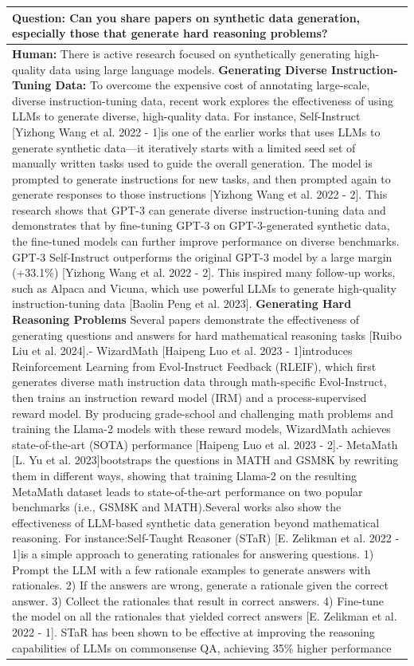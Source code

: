 \begin{table}[t!]
\renewcommand{\arraystretch}{1.2}
\setlength{\tabcolsep}{2pt}
\footnotesize
    \centering
    \begin{tabular}{p{15cm}}%
\toprule
{\bf Question:} Can you share papers on synthetic data generation, especially those that generate hard reasoning problems?
\\\midrule
{\bf Human:} There is active research focused on synthetically generating high-quality data using large language models. 
{\bf Generating Diverse Instruction-Tuning Data:} To overcome the expensive cost of annotating large-scale, diverse instruction-tuning data, recent work explores the effectiveness of using LLMs to generate diverse, high-quality data. For instance, Self-Instruct [Yizhong Wang et al. 2022 - 1]is one of the earlier works that uses LLMs to generate synthetic data—it iteratively starts with a limited seed set of manually written tasks used to guide the overall generation. The model is prompted to generate instructions for new tasks, and then prompted again to generate responses to those instructions [Yizhong Wang et al. 2022 - 2]. This research shows that GPT-3 can generate diverse instruction-tuning data and demonstrates that by fine-tuning GPT-3 on GPT-3-generated synthetic data, the fine-tuned models can further improve performance on diverse benchmarks. GPT-3 Self-Instruct outperforms the original GPT-3 model by a large margin (+33.1\%) [Yizhong Wang et al. 2022 - 2]. This inspired many follow-up works, such as Alpaca and Vicuna, which use powerful LLMs to generate high-quality instruction-tuning data [Baolin Peng et al. 2023]. {\bf Generating Hard Reasoning Problems} Several papers demonstrate the effectiveness of generating questions and answers for hard mathematical reasoning tasks [Ruibo Liu et al. 2024].- WizardMath [Haipeng Luo et al. 2023 - 1]introduces Reinforcement Learning from Evol-Instruct Feedback (RLEIF), which first generates diverse math instruction data through math-specific Evol-Instruct, then trains an instruction reward model (IRM) and a process-supervised reward model. By producing grade-school and challenging math problems and training the Llama-2 models with these reward models, WizardMath achieves state-of-the-art (SOTA) performance [Haipeng Luo et al. 2023 - 2].- MetaMath [L. Yu et al. 2023]bootstraps the questions in MATH and GSM8K by rewriting them in different ways, showing that training Llama-2 on the resulting MetaMath dataset leads to state-of-the-art performance on two popular benchmarks (i.e., GSM8K and MATH).Several works also show the effectiveness of LLM-based synthetic data generation beyond mathematical reasoning. For instance:Self-Taught Reasoner (STaR) [E. Zelikman et al. 2022 - 1]is a simple approach to generating rationales for answering questions. 1) Prompt the LLM with a few rationale examples to generate answers with rationales. 2) If the answers are wrong, generate a rationale given the correct answer. 3) Collect the rationales that result in correct answers. 4) Fine-tune the model on all the rationales that yielded correct answers [E. Zelikman et al. 2022 - 1]. STaR has been shown to be effective at improving the reasoning capabilities of LLMs on commonsense QA, achieving 35\% higher performance 
\end{tabular}
\end{table}
